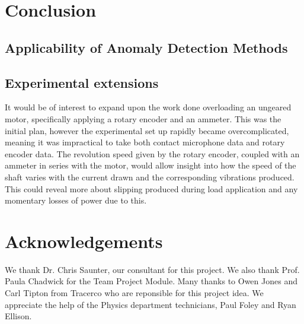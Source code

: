\section{Conclusion}
\label{sec:conclusion}

\subsection{Applicability of Anomaly Detection Methods}

\subsection{Experimental extensions }

It would be of interest to expand upon the work done overloading an ungeared motor, specifically applying a rotary encoder and an ammeter. This was the initial plan, however the experimental set up rapidly became overcomplicated, meaning it was impractical to take both contact microphone data and rotary encoder data. The revolution speed given by the rotary encoder, coupled with an ammeter in series with the motor, would allow insight into how the speed of the shaft varies with the current drawn and the corresponding vibrations produced. This could reveal more about slipping produced during load application and any momentary losses of power due to this. 





\section*{Acknowledgements}

\small We thank Dr. Chris Saunter, our consultant for this project. We also thank Prof. Paula Chadwick for the Team Project Module. Many thanks to Owen Jones and Carl Tipton from Tracerco who are reponsible for this project idea. We appreciate the help of the Physics department technicians, Paul Foley and Ryan Ellison.




















































